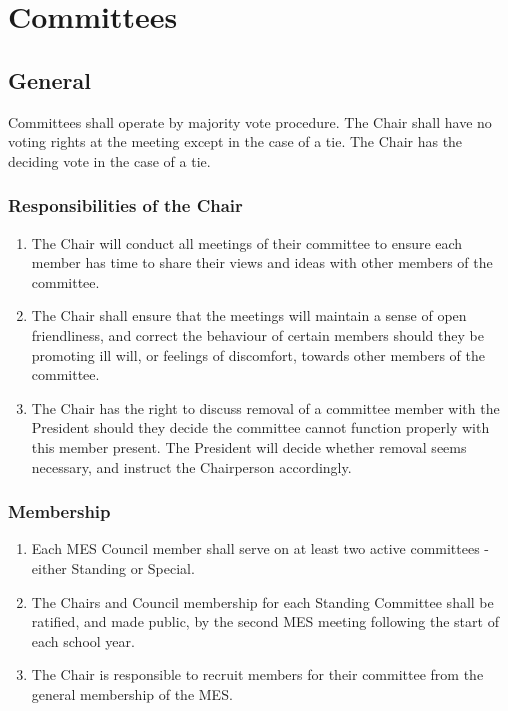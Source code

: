 \section{Committees}
\label{committees}

\subsection{General}
\label{committees-general}
Committees shall operate by majority vote procedure. The Chair shall
have no voting rights at the meeting except in the case of a tie. The
Chair has the deciding vote in the case of a tie.

\subsubsection{Responsibilities of the Chair}
\label{responsibilities-of-the-chair}

\begin{enumerate}
 \item
  The Chair will conduct all meetings of their committee to ensure each
  member has time to share their views and ideas with other members of
  the committee.
 \item
  The Chair shall ensure that the meetings will maintain a sense of open
  friendliness, and correct the behaviour of certain members should they
  be promoting ill will, or feelings of discomfort, towards other
  members of the committee.
 \item
  The Chair has the right to discuss removal of a committee member with
  the President should they decide the committee cannot function
  properly with this member present. The President will decide whether
  removal seems necessary, and instruct the Chairperson accordingly.
\end{enumerate}

\subsubsection{Membership}
\label{membership}
\begin{enumerate}
 \item
  Each MES Council member shall serve on at least two active committees
  - either Standing or Special.
 \item
  The Chairs and Council membership for each Standing Committee shall be
  ratified, and made public, by the second MES meeting following the
  start of each school year.
 \item
  The Chair is responsible to recruit members for their committee from
  the general membership of the MES.

\end{enumerate}


